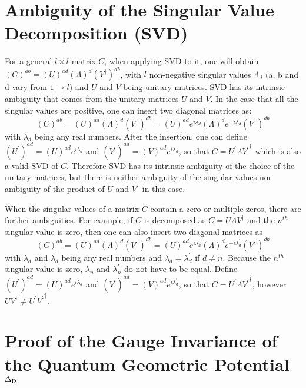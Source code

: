 \documentclass[aps,pra,twocolumn,groupedaddress,10pt]{revtex4}
\begin{document}
\begin{widetext}
\section{Ambiguity of  the Singular Value Decomposition (SVD)}
For a general $l\times l$ matrix $C$, when applying SVD to it, one will obtain $(C)^{ab} = (U)^{ad}(\Lambda)^{d}(V^{\dag})^{db}$, with $l$ non-negative singular values $\Lambda_{d}$ (a, b and d vary from $1\rightarrow l$) and $U$ and $V$ being unitary matrices. SVD has its intrinsic ambiguity that comes from the unitary matrices $U$ and $V$. In the case that all the singular values are positive, one can insert two diagonal matrices as:
\begin{equation}
	(C)^{ab} = (U)^{ad}(\Lambda)^{d}(V^{\dag})^{db} = (U)^{ad}e^{i\lambda_d}(\Lambda)^{d}e^{-i\lambda_d}(V^{\dag})^{db}
\end{equation}
with $\lambda_d$ being any real numbers.
After the insertion, one can define $(U^{\prime})^{ad} = (U)^{ad}e^{i\lambda_d}$ and $(V^{\prime})^{ad} = (V)^{ad}e^{i\lambda_d}$, so that $C = U^{\prime}\Lambda {V^{\prime}}^{\dag}$ which is also a valid SVD of $C$. Therefore SVD has its intrinsic ambiguity of the choice of the unitary matrices, but there is neither ambiguity of the singular values nor ambiguity of the product of $U$ and $V^{\dag}$ in this case.

When the singular values of a matrix $C$ contain a zero or multiple zeros, there are further ambiguities. For example, if $C$ is decomposed as $C = U\Lambda V^{\dag}$ and the $n^{th}$ singular value is zero, then one can also insert two diagonal matrices as
\begin{equation}
	(C)^{ab} = (U)^{ad}(\Lambda)^{d}(V^{\dag})^{db} = (U)^{ad}e^{i\lambda_d}(\Lambda)^{d}e^{-i\lambda_d^{\prime}}(V^{\dag})^{db}
\end{equation}
with $\lambda_d$ and $\lambda_d^{\prime}$ being any real numbers and $\lambda_d = \lambda_d^{\prime}$ if $d\neq n$. Because the $n^{th}$ singular value is zero, $\lambda_n$ and $\lambda_n^{\prime}$ do not have to be equal. Define $(U^{\prime})^{ad} = (U)^{ad}e^{i\lambda_d}$ and $(V^{\prime})^{ad} = (V)^{ad}e^{i\lambda_d^{\prime}}$, so that $C = U^{\prime}\Lambda {V^{\prime}}^{\dag}$, however $UV^{\dag} \neq U^{\prime}{V^{\prime}}^{\dag}$.


\section{ Proof of the Gauge Invariance of the Quantum Geometric Potential $\Delta_{\rm{D}}$}


\end{widetext}
\end{document}
